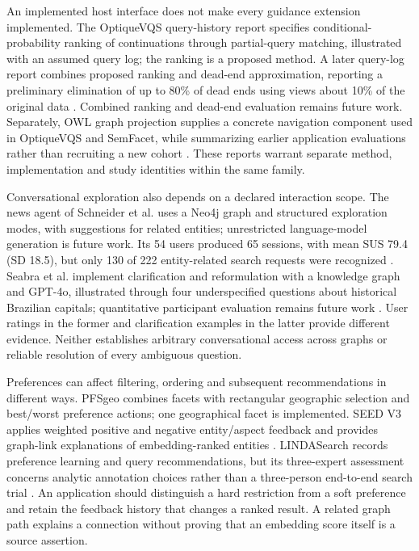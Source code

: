 \documentclass[manuscript,review,screen]{acmart}
\begin{document}
An implemented host interface does not make every guidance extension implemented. The OptiqueVQS query-history report specifies conditional-probability ranking of continuations through partial-query matching, illustrated with an assumed query log; the ranking is a proposed method. A later query-log report combines proposed ranking and dead-end approximation, reporting a preliminary elimination of up to 80\% of dead ends using views about 10\% of the original data \citep{V3-02739,V3-01984}. Combined ranking and dead-end evaluation remains future work. Separately, OWL graph projection supplies a concrete navigation component used in OptiqueVQS and SemFacet, while summarizing earlier application evaluations rather than recruiting a new cohort \citep{V3-01948}. These reports warrant separate method, implementation and study identities within the same family.

Conversational exploration also depends on a declared interaction scope. The news agent of Schneider et al. uses a Neo4j graph and structured exploration modes, with suggestions for related entities; unrestricted language-model generation is future work. Its 54 users produced 65 sessions, with mean SUS 79.4 (SD 18.5), but only 130 of 222 entity-related search requests were recognized \citep{V3-01173}. Seabra et al. implement clarification and reformulation with a knowledge graph and GPT-4o, illustrated through four underspecified questions about historical Brazilian capitals; quantitative participant evaluation remains future work \citep{V3-01170}. User ratings in the former and clarification examples in the latter provide different evidence. Neither establishes arbitrary conversational access across graphs or reliable resolution of every ambiguous question.

Preferences can affect filtering, ordering and subsequent recommendations in different ways. PFSgeo combines facets with rectangular geographic selection and best/worst preference actions; one geographical facet is implemented. SEED V3 applies weighted positive and negative entity/aspect feedback and provides graph-link explanations of embedding-ranked entities \citep{V3-02091,V3-02418}. LINDASearch records preference learning and query recommendations, but its three-expert assessment concerns analytic annotation choices rather than a three-person end-to-end search trial \citep{V3-01754}. An application should distinguish a hard restriction from a soft preference and retain the feedback history that changes a ranked result. A related graph path explains a connection without proving that an embedding score itself is a source assertion.
\end{document}
